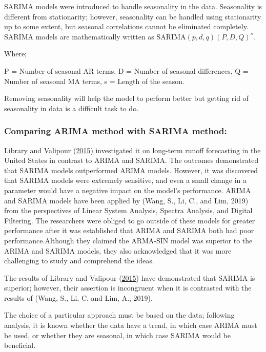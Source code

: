 \documentclass[
  onepage,
  openany]{scrbook}
\begin{document}
SARIMA models were introduced to handle seasonality in the data.
Seasonality is different from stationarity; however, seasonality can be
handled using stationarity up to some extent, but seasonal correlations
cannot be eliminated completely. SARIMA models are mathematically
written as SARIMA\((p,d,q)(P,D,Q)^{s}\).

Where;

P = Number of seasonal AR terms, D = Number of seasonal differences, Q =
Number of seasonal MA terms, s = Length of the season.

Removing seasonality will help the model to perform better but getting
rid of seasonality in data is a difficult task to do.

\hypertarget{comparing-arima-method-with-sarima-method}{%
\subsubsection{\texorpdfstring{\textbf{Comparing ARIMA method with
SARIMA
method:}}{Comparing ARIMA method with SARIMA method:}}\label{comparing-arima-method-with-sarima-method}}

Library and Valipour (\protect\hyperlink{ref-library2015}{2015})
investigated it on long-term runoff forecasting in the United States in
contrast to ARIMA and SARIMA. The outcomes demonstrated that SARIMA
models outperformed ARIMA models. However, it was discovered that SARIMA
models were extremely sensitive, and even a small change in a parameter
would have a negative impact on the model's performance. ARIMA and
SARIMA models have been applied by (Wang, S., Li, C., and Lim, 2019)
from the perspectives of Linear System Analysis, Spectra Analysis, and
Digital Filtering. The researchers were obliged to go outside of these
models for greater performance after it was established that ARIMA and
SARIMA both had poor performance.Although they claimed the ARMA-SIN
model was superior to the ARIMA and SARIMA models, they also
acknowledged that it was more challenging to study and comprehend the
ideas.

The results of Library and Valipour
(\protect\hyperlink{ref-library2015}{2015}) have demonstrated that
SARIMA is superior; however, their assertion is incongruent when it is
contrasted with the results of (Wang, S., Li, C. and Lim, A., 2019).

The choice of a particular approach must be based on the data; following
analysis, it is known whether the data have a trend, in which case ARIMA
must be used, or whether they are seasonal, in which case SARIMA would
be beneficial.
\end{document}

